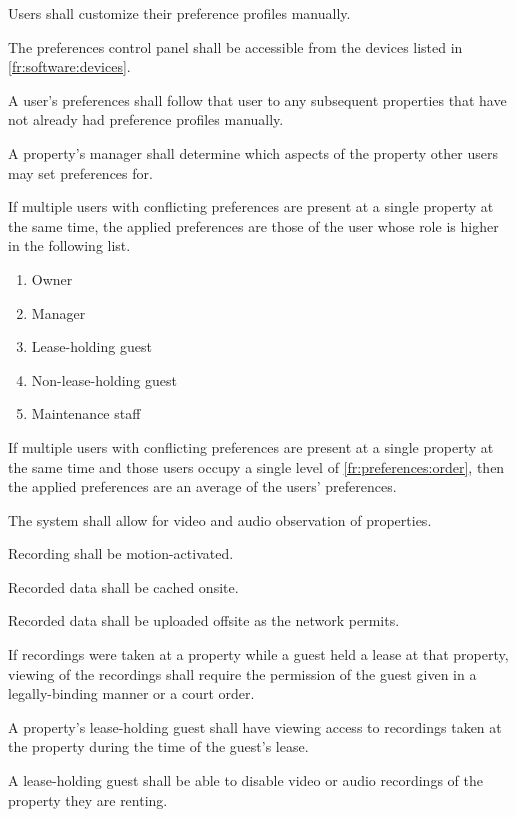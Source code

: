 \documentclass[letter,titlepage,oneside,english]{report}
\begin{document}
\begin{fr}
\begin{fr}
    Users shall customize their preference profiles manually.
  \item
    The preferences control panel shall be accessible from the devices listed in \ref{fr:software:devices}.
  \item
    A user's preferences shall follow that user to any subsequent properties that have not already had preference profiles manually.
  \item
    A property's manager shall determine which aspects of the property other users may set preferences for.
  \item\label{fr:preferences:order}
    If multiple users with conflicting preferences are present at a single property at the same time, the applied preferences are those of the user whose role is higher in the following list.
    \begin{enumerate}
    \item
      Owner
    \item
      Manager
    \item
      Lease-holding guest
    \item
      Non-lease-holding guest
    \item
      Maintenance staff
    \end{enumerate}
  \item
    If multiple users with conflicting preferences are present at a single property at the same time and those users occupy a single level of \ref{fr:preferences:order}, then the applied preferences are an average of the users' preferences.
  \end{fr}
\item
  The system shall allow for video and audio observation of properties.
  \begin{fr}
  \item
    Recording shall be motion-activated.
  \item
    Recorded data shall be cached onsite.
  \item
    Recorded data shall be uploaded offsite as the network permits.
  \item
    If recordings were taken at a property while a guest held a lease at that property, viewing of the recordings shall require the permission of the guest given in a legally-binding manner or a court order.
  \item
    A property's lease-holding guest shall have viewing access to recordings taken at the property during the time of the guest's lease.
  \item
    A lease-holding guest shall be able to disable video or audio recordings of the property they are renting.

\end{fr}
\end{fr}
\end{document}
